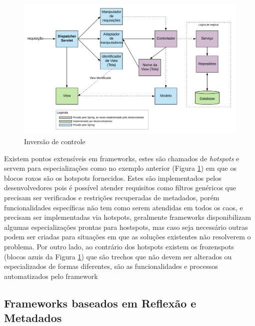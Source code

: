 \begin{figure}[H]
    \centering
    \includegraphics[scale=0.2]{src/imagens/cap2/arquitetura-spring-traduzida.png}
    \caption{Inversão de controle}
    \label{fig:inversao-controle}
\end{figure}

\par Existem pontos extensíveis em frameworks, estes são chamados de \textit{hotspots} e servem para especializações como no exemplo anterior (Figura \ref{fig:inversao-controle}) em que os blocos roxos são os hotspots fornecidos. Estes são implementados pelos desenvolvedores pois é possível atender requisitos como filtros genéricos que precisam ser verificados e restrições recuperadas de metadados, porém funcionalidades específicas não tem como serem atendidas em todos os caos, e precisam ser implementadas via hotspots, geralmente frameworks disponibilizam algumas especializações prontas para hostspots, mas caso seja necessário outras podem ser criadas para situações em que as soluções existentes não resolverem o problema. Por outro lado, ao contrário dos hotspots existem os frozenspots (blocos azuis da Figura \ref{fig:inversao-controle}) que são trechos que não devem ser alterados ou especializados de formas diferentes, são as funcionalidades e processos automatizados pelo framework \cite{markiewicz2001object}

\subsection{Frameworks baseados em Reflexão e Metadados}

